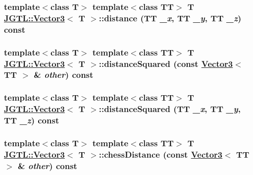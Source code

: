 \hypertarget{class_j_g_t_l_1_1_vector3_e55adc165958fafafcfa9adfffe1ff95}{
\subsubsection[distance]{\setlength{\rightskip}{0pt plus 5cm}template$<$class T$>$ template$<$class TT$>$ T \hyperlink{class_j_g_t_l_1_1_vector3}{JGTL::Vector3}$<$ T $>$::distance (TT {\em \_\-x}, TT {\em \_\-y}, TT {\em \_\-z}) const}}
\label{class_j_g_t_l_1_1_vector3_e55adc165958fafafcfa9adfffe1ff95}


\hypertarget{class_j_g_t_l_1_1_vector3_2e9c8d410cd86d2e7d21ac2eb2388e4e}{
\subsubsection[distanceSquared]{\setlength{\rightskip}{0pt plus 5cm}template$<$class T$>$ template$<$class TT$>$ T \hyperlink{class_j_g_t_l_1_1_vector3}{JGTL::Vector3}$<$ T $>$::distance\-Squared (const \hyperlink{class_j_g_t_l_1_1_vector3}{Vector3}$<$ TT $>$ \& {\em other}) const}}
\label{class_j_g_t_l_1_1_vector3_2e9c8d410cd86d2e7d21ac2eb2388e4e}


\hypertarget{class_j_g_t_l_1_1_vector3_7b0b15fa58322486fb84fdea770cbddc}{
\subsubsection[distanceSquared]{\setlength{\rightskip}{0pt plus 5cm}template$<$class T$>$ template$<$class TT$>$ T \hyperlink{class_j_g_t_l_1_1_vector3}{JGTL::Vector3}$<$ T $>$::distance\-Squared (TT {\em \_\-x}, TT {\em \_\-y}, TT {\em \_\-z}) const}}
\label{class_j_g_t_l_1_1_vector3_7b0b15fa58322486fb84fdea770cbddc}


\hypertarget{class_j_g_t_l_1_1_vector3_70e5b9547233d0ae15a803586825f96b}{
\subsubsection[chessDistance]{\setlength{\rightskip}{0pt plus 5cm}template$<$class T$>$ template$<$class TT$>$ T \hyperlink{class_j_g_t_l_1_1_vector3}{JGTL::Vector3}$<$ T $>$::chess\-Distance (const \hyperlink{class_j_g_t_l_1_1_vector3}{Vector3}$<$ TT $>$ \& {\em other}) const}}
\label{class_j_g_t_l_1_1_vector3_70e5b9547233d0ae15a803586825f96b}


